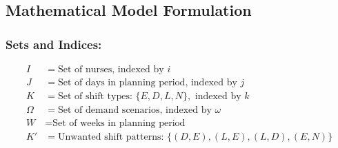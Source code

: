 \documentclass[10pt,a4paper,twocolumn]{article}
\begin{document}
\subsection{Mathematical Model Formulation}

\subsubsection{Sets and Indices:}
\begin{align*}
I &= \text{Set of nurses, indexed by } i \\
J &= \text{Set of days in planning period, indexed by } j \\
K &= \text{Set of shift types: } \{E, D, L, N\}, \text{ indexed by } k \\
\Omega &= \text{Set of demand scenarios, indexed by } \omega \\
W &= \text{Set of weeks in planning period} \\
K' &= \text{Unwanted shift patterns: } \{(D,E), (L,E), (L,D), (E,N)\}
\end{align*}
\end{document}
